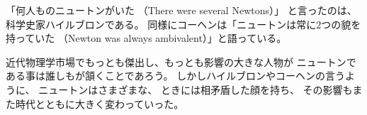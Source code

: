\documentclass{jlreq}
\begin{document}
「何人ものニュートンがいた （There were several Newtons）」
と言ったのは、科学史家ハイルブロンである。%
同様にコーヘンは「ニュートンは常に2つの貌を持っていた%
（Newton was always ambivalent）」と語っている。

\noindent 近代物理学市場でもっとも傑出し、もっとも影響の大きな人物が
ニュートンである事は誰しもが頷くことであろう。
しかしハイルブロンやコーヘンの言うように、
ニュートンはさまざまな、%
ときには相矛盾した顔を持ち、
その影響もまた時代とともに大きく変わっていった。
 
\end{document}
